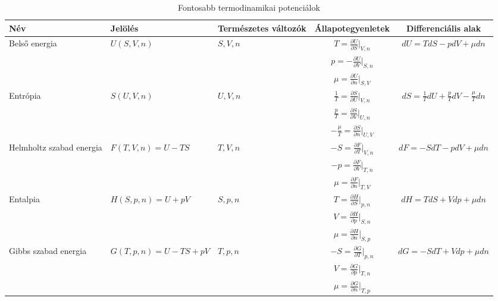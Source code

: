 \documentclass[../main.tex]{subfiles}
\begin{document}
\begin{table}[H]
    \centering
    \begin{tabular}{|p{2cm}|p{4cm}|p{2cm}|c|c|}
        \hline
        Név & Jelölés & Természetes változók & Állapotegyenletek & Differenciális alak \\
        \hline
        Belső energia & $U(S, V, n)$ & $S, V, n$ & $T = \frac{\partial U}{\partial S}\big|_{V,n}$ & $dU = T dS - p dV + \mu dn$ \\
         &  &  & $p = - \frac{\partial U}{\partial V}\big|_{S,n}$ &  \\
         &  &  & $\mu = \frac{\partial U}{\partial n}\big|_{S,V}$ &  \\
        \hline
        Entrópia & $S(U, V, n)$ & $U, V, n$ & $\frac{1}{T} = \frac{\partial S}{\partial U}\big|_{V,n}$ & $dS = \frac{1}{T} dU + \frac{p}{T} dV - \frac{\mu}{T} dn$ \\
         &  &  & $\frac{p}{T} = \frac{\partial S}{\partial V}\big|_{U,n}$ &  \\
         &  &  & $- \frac{\mu}{T} = \frac{\partial S}{\partial n}\big|_{U,V}$ &  \\
        \hline
        Helmholtz szabad energia & $F(T, V, n) = U - TS$ & $T, V, n$ & $- S = \frac{\partial F}{\partial T}\big|_{V,n}$ & $dF = - S dT - p dV + \mu dn$ \\
         &  &  & $- p = \frac{\partial F}{\partial V}\big|_{T,n}$ &  \\
         &  &  & $\mu = \frac{\partial F}{\partial n}\big|_{T,V}$ &  \\
        \hline
        Entalpia & $H(S, p, n) = U + pV$ & $S, p, n$ & $T = \frac{\partial H}{\partial S}\big|_{p,n}$ & $dH = T dS + V dp + \mu dn$ \\
         &  &  & $V = \frac{\partial H}{\partial p}\big|_{S,n}$ &  \\
         &  &  & $\mu = \frac{\partial H}{\partial n}\big|_{S,p}$ &  \\
        \hline
        Gibbs szabad energia & $G(T, p, n) = U - TS + pV$ & $T, p, n$ & $- S = \frac{\partial G}{\partial T}\big|_{p,n}$ & $dG = - S dT + V dp + \mu dn$ \\
         &  &  & $V = \frac{\partial G}{\partial p}\big|_{T,n}$ &  \\
         &  &  & $\mu = \frac{\partial G}{\partial n}\big|_{T,p}$ &  \\
        \hline
    \end{tabular}
    \caption{Fontosabb termodinamikai potenciálok}
\end{table}
\end{document}
